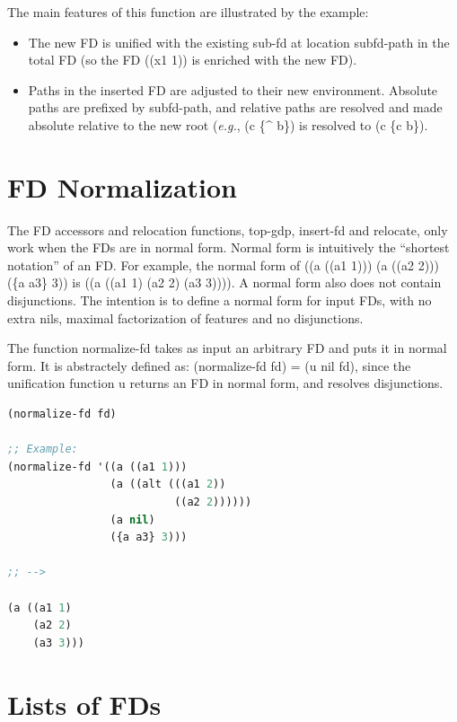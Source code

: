 \documentclass[10pt,a4paper]{report}
\begin{document}
The main features of this function are illustrated by the example:
\begin{itemize}
\item The new FD is unified with the existing sub-fd at location subfd-path in
the total FD (so the FD ((x1 1)) is enriched with the new FD).

\item Paths in the inserted FD are adjusted to their new environment.  Absolute
paths are prefixed by subfd-path, and relative paths are resolved and made
absolute relative to the new root ({\em e.g.}, (c \{\^{} b\}) is resolved to 
(c \{c b\}). 
\end{itemize}


\section{FD Normalization}

The FD accessors and relocation functions, top-gdp, insert-fd and relocate,
only work when the FDs are in normal form.  Normal form is intuitively the
``shortest notation'' of an FD.  For example, the normal form of 
((a ((a1 1))) (a ((a2 2))) (\{a a3\} 3)) is
((a ((a1 1) (a2 2) (a3 3)))).  A normal form also does not contain
disjunctions.  The intention is to define a normal form for input FDs, with
no extra nils, maximal factorization of features and no disjunctions.

The function normalize-fd takes as input an arbitrary FD and puts it in
normal form.  It is abstractely defined as: (normalize-fd fd) = (u nil fd),
since the unification function u returns an FD in normal form, and resolves
disjunctions. 

\begin{lstlisting}[language=Lisp]
(normalize-fd fd)

;; Example:
(normalize-fd '((a ((a1 1))) 
                (a ((alt (((a1 2)) 
                          ((a2 2)))))) 
                (a nil) 
                ({a a3} 3)))

;; -->

(a ((a1 1)
    (a2 2)
    (a3 3)))
\end{lstlisting}



\section{Lists of FDs}
\end{document}
